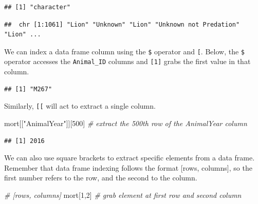 \documentclass[
]{book}
\newenvironment{Shaded}{\begin{snugshade}}{\end{snugshade}}
\newcommand{\CommentTok}[1]{\textcolor[rgb]{0.56,0.35,0.01}{\textit{#1}}}
\newcommand{\DecValTok}[1]{\textcolor[rgb]{0.00,0.00,0.81}{#1}}
\newcommand{\FunctionTok}[1]{\textcolor[rgb]{0.13,0.29,0.53}{\textbf{#1}}}
\newcommand{\NormalTok}[1]{#1}
\newcommand{\SpecialCharTok}[1]{\textcolor[rgb]{0.81,0.36,0.00}{\textbf{#1}}}
\newcommand{\StringTok}[1]{\textcolor[rgb]{0.31,0.60,0.02}{#1}}
\begin{document}
\begin{verbatim}
## [1] "character"
\end{verbatim}

\begin{Shaded}
\end{Shaded}

\begin{verbatim}
##  chr [1:1061] "Lion" "Unknown" "Lion" "Unknown not Predation" "Lion" ...
\end{verbatim}

We can index a data frame column using the \texttt{\$} operator and \texttt{{[}}. Below, the \texttt{\$} operator accesses the \texttt{Animal\_ID} columns and \texttt{{[}1{]}} grabs the first value in that column.

\begin{Shaded}
\end{Shaded}

\begin{verbatim}
## [1] "M267"
\end{verbatim}

Similarly, \texttt{{[}{[}} will act to extract a single column.

\begin{Shaded}
\begin{Highlighting}[]
\NormalTok{mort[[}\StringTok{"AnimalYear"}\NormalTok{]][}\DecValTok{500}\NormalTok{] }\CommentTok{\# extract the 500th row of the AnimalYear column}
\end{Highlighting}
\end{Shaded}

\begin{verbatim}
## [1] 2016
\end{verbatim}

We can also use square brackets to extract specific elements from a data frame. Remember that data frame indexing follows the format {[}rows, columns{]}, so the first number refers to the row, and the second to the column.

\begin{Shaded}
\begin{Highlighting}[]
\CommentTok{\# [rows, columns]}
\NormalTok{mort[}\DecValTok{1}\NormalTok{,}\DecValTok{2}\NormalTok{] }\CommentTok{\# grab element at first row and second column}
\end{Highlighting}
\end{Shaded}
\end{document}
